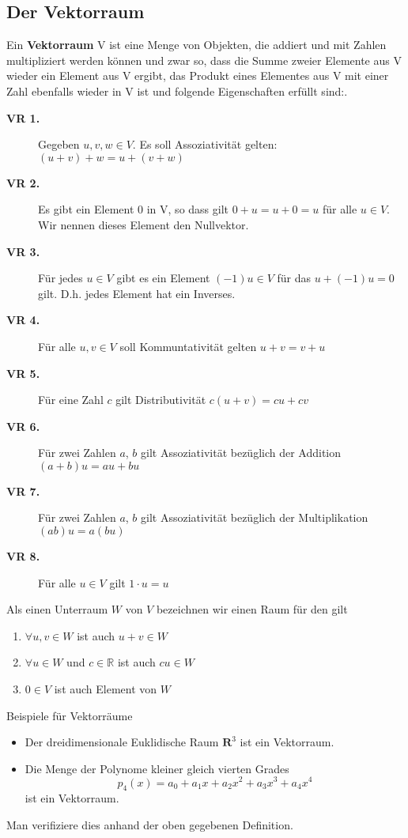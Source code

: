 \subsection{Der Vektorraum}
Ein {\bf Vektorraum} V ist eine Menge von Objekten, die addiert und mit Zahlen
multipliziert werden können und zwar so, dass die Summe zweier Elemente aus V
wieder ein Element aus V ergibt, das Produkt eines Elementes aus V mit einer Zahl
ebenfalls wieder in V ist und folgende Eigenschaften erfüllt sind:.
\begin{description}
  \item[{\bf VR 1.}] Gegeben $u,v,w\in V$. Es soll Assoziativität gelten: $(u+v)+w = u+(v+w)$
  \item[{\bf VR 2.}] Es gibt ein Element 0 in V, so dass gilt $0+u = u+0 =u$
    für alle $u\in V$. Wir nennen dieses Element den Nullvektor.
  \item[{\bf VR 3.}] Für jedes $u\in V$ gibt es ein Element $(-1)u\in V$ für das $u+(-1)u=0$
    gilt. D.h. jedes Element hat ein Inverses.
  \item[{\bf VR 4.}] Für alle $u,v\in V$ soll Kommuntativität gelten $u+v = v+u$
  \item[{\bf VR 5.}] Für eine Zahl $c$ gilt Distributivität $c(u+v)=cu+cv$ 
  \item[{\bf VR 6.}] Für zwei Zahlen $a$, $b$ gilt Assoziativität bezüglich der
    Addition $(a+b)u=au+bu$
  \item[{\bf VR 7.}] Für zwei Zahlen $a$, $b$ gilt Assoziativität bezüglich der
    Multiplikation $(ab)u=a(bu)$
  \item[{\bf VR 8.}] Für alle $u\in V$ gilt $1\cdot u=u$
\end{description}
Als einen Unterraum $W$ von $V$ bezeichnen wir einen Raum für den gilt
\begin{enumerate}
  \item $\forall u,v\in W$ ist auch $u+v\in W$
  \item $\forall u\in W$ und $c\in\mathbb{R}$ ist auch $cu\in W$
  \item $0\in V$ ist auch Element von $W$ 
\end{enumerate}
\begin{example}{Beispiele für Vektorräume}
  \begin{itemize}
    \item Der dreidimensionale Euklidische Raum $\mathbf{R}^3$ ist ein Vektorraum.
    \item Die Menge der Polynome kleiner gleich vierten Grades 
      \[p_4(x)=a_0+a_1x+a_2x^2+a_3x^3+a_4x^4\]
      ist ein Vektorraum.
  \end{itemize}
  Man verifiziere dies anhand der oben gegebenen Definition.
\end{example}
